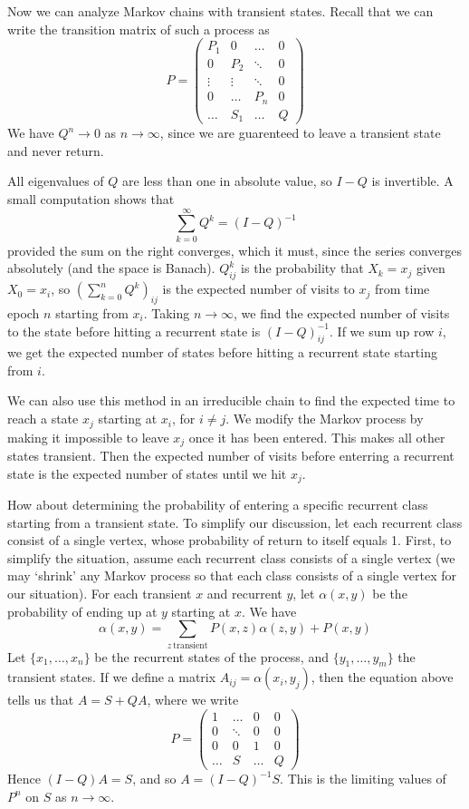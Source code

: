 Now we can analyze Markov chains with transient states. Recall that we can write the transition matrix of such a process as
%
\[ P = \begin{pmatrix} P_1 & 0 & \dots & 0 \\ 0 & P_2 & \ddots & 0 \\ \vdots & \vdots & \ddots & 0 \\ 0 & \dots & P_n & 0 \\ \dots & S_1 & \dots & Q \end{pmatrix} \]
%
We have $Q^n \to 0$ as $n \to \infty$, since we are guarenteed to leave a transient state and never return.

All eigenvalues of $Q$ are less than one in absolute value, so $I - Q$ is invertible. A small computation shows that
%
\[ \sum_{k = 0}^\infty Q^k = (I - Q)^{-1} \]
%
provided the sum on the right converges, which it must, since the series converges absolutely (and the space is Banach). $Q^k_{ij}$ is the probability that $X_k = x_j$ given $X_0 = x_i$, so $(\sum_{k = 0}^n Q^k)_{ij}$ is the expected number of visits to $x_j$ from time epoch $n$ starting from $x_i$. Taking $n \to \infty$, we find the expected number of visits to the state before hitting a recurrent state is $(I - Q)^{-1}_{ij}$. If we sum up row $i$, we get the expected number of states before hitting a recurrent state starting from $i$.

We can also use this method in an irreducible chain to find the expected time to reach a state $x_j$ starting at $x_i$, for $i \neq j$. We modify the Markov process by making it impossible to leave $x_j$ once it has been entered. This makes all other states transient. Then the expected number of visits before enterring a recurrent state is the expected number of states until we hit $x_j$.

How about determining the probability of entering a specific recurrent class starting from a transient state. To simplify our discussion, let each recurrent class consist of a single vertex, whose probability of return to itself equals 1. First, to simplify the situation, assume each recurrent class consists of a single vertex (we may `shrink' any Markov process so that each class consists of a single vertex for our situation). For each transient $x$ and recurrent $y$, let $\alpha(x,y)$ be the probability of ending up at $y$ starting at $x$. We have
%
\[ \alpha(x,y) = \sum_{z\ \text{transient}} P(x, z) \alpha(z,y) + P(x, y) \]
%
Let $\{ x_1, \dots, x_n \}$ be the recurrent states of the process, and $\{ y_1, \dots, y_m \}$ the transient states. If we define a matrix $A_{ij} = \alpha(x_i, y_j)$, then the equation above tells us that $A = S + QA$, where we write
%
\[ P = \begin{pmatrix} 1 & \dots & 0 & 0 \\ 0 & \ddots & 0 & 0 \\ 0 & 0 & 1 & 0 \\ \dots & S & \dots & Q \end{pmatrix} \]
%
Hence $(I - Q)A = S$, and so $A = (I - Q)^{-1}S$. This is the limiting values of $P^n$ on $S$ as $n \to \infty$.

